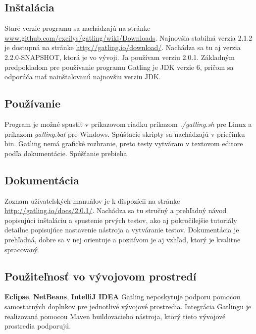 \documentclass[12pt,oneside,final]{fithesis-utf8}
\begin{document}
\subsection{Inštalácia}
Staré verzie programu sa nachádzajú na stránke \url{www.github.com/excilys/gatling/wiki/Downloads}. Najnovšia stabilná verzia 2.1.2 je dostupná na stránke \url{http://gatling.io/download/}. Nachádza sa tu aj verzia 2.2.0-SNAPSHOT, ktorá je vo vývoji. Ja používam verziu 2.0.1. Základným predpokladom pre používanie programu Gatling je JDK verzie 6, pričom sa odporúča mať nainštalovanú najnovšiu verziu JDK.

\subsection{Používanie}
Program je možné spustiť v príkazovom riadku príkazom \textit{./gatling.sh} pre Linux a príkazom \textit{gatling.bat} pre Windows. Spúšťacie skripty sa nachádzajú v priečinku bin. Gatling nemá grafické rozhranie, preto testy vytváram v textovom editore podľa dokumentácie. Spúšťanie prebieha

\subsection{Dokumentácia}
Zoznam užívateľských manuálov je k dispozícii na stránke \url{http://gatling.io/docs/2.0.1/}. Nachádza sa tu stručný a prehľadný návod popisujúci inštaláciu a spustenie prvých testov, ako aj pokročilejšie tutoriály detailne popisujúce nastavenie nástroja a vytváranie testov. Dokumentácia je prehľadná, dobre sa v nej orientuje a pozitívom je aj vzhľad, ktorý je kvalitne spracovaný.


\subsection{Použiteľnosť vo vývojovom prostredí}
\textbf{Eclipse}, \textbf{NetBeans}, \textbf{IntelliJ IDEA}
\newline
Gatling neposkytuje podporu pomocou samostatných doplnkov pre jednotlivé vývojové prostredia. Integrácia Gatlingu je realizovaná pomocou Maven buildovacieho nástroja, ktorý tieto vývojové prostredia podporujú.
\end{document}
